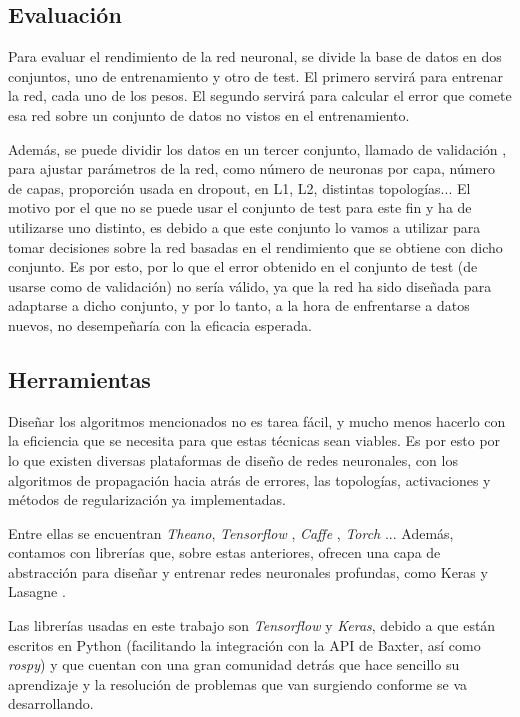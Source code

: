 \subsection{Evaluación}
Para evaluar el rendimiento de la red neuronal, se divide la base de datos en dos conjuntos, uno de entrenamiento y otro de test. El primero servirá para entrenar la red, cada uno de los pesos. El segundo servirá para calcular el error que comete esa red sobre un conjunto de datos no vistos en el entrenamiento.

Además, se puede dividir los datos en un tercer conjunto, llamado de validación \cite{kohavi1995study}, para ajustar parámetros de la red, como número de neuronas por capa, número de capas, proporción usada en dropout, en L1, L2, distintas topologías... El motivo por el que no se puede usar el conjunto de test para este fin y ha de utilizarse uno distinto, es debido a que este conjunto lo vamos a utilizar para tomar decisiones sobre la red basadas en el rendimiento que se obtiene con dicho conjunto. Es por esto, por lo que el error obtenido en el conjunto de test (de usarse como de validación) no sería válido, ya que la red ha sido diseñada para adaptarse a dicho conjunto, y por lo tanto, a la hora de enfrentarse a datos nuevos, no desempeñaría con la eficacia esperada.

\subsection{Herramientas}
Diseñar los algoritmos mencionados no es tarea fácil, y mucho menos hacerlo con la eficiencia que se necesita para que estas técnicas sean viables. Es por esto por lo que existen diversas plataformas de diseño de redes neuronales, con los algoritmos de propagación hacia atrás de errores, las topologías, activaciones y métodos de regularización ya implementadas.

Entre ellas se encuentran \textit{Theano}, \textit{Tensorflow} \cite{tensorflow}, \textit{Caffe} \cite{caffe}, \textit{Torch} \cite{torch}... Además, contamos con librerías que, sobre estas anteriores, ofrecen una capa de abstracción para diseñar y entrenar redes neuronales profundas, como Keras \cite{keras} y Lasagne \cite{lasagne}.

Las librerías usadas en este trabajo son \textit{Tensorflow} y \textit{Keras}, debido a que están escritos en Python (facilitando la integración con la API de Baxter, así como \textit{rospy}) y que cuentan con una gran comunidad detrás que hace sencillo su aprendizaje y la resolución de problemas que van surgiendo conforme se va desarrollando.
